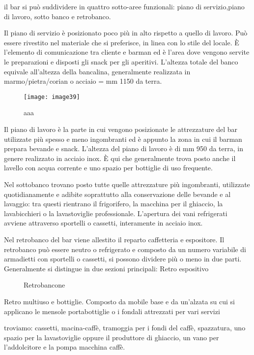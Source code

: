 il bar si può suddividere in quattro sotto-aree funzionali: piano di servizio,piano di lavoro, sotto banco  e retrobanco.

Il piano di servizio è posizionato poco più in alto rispetto a quello di lavoro. Può essere rivestito nel materiale che si preferisce, in linea con lo stile del locale. 
È l’elemento di comunicazione tra cliente e barman ed è l’area dove vengono servite le preparazioni e disposti gli snack per gli aperitivi.
L’altezza totale del banco equivale all'altezza della bancalina, generalmente realizzata in marmo/pietra/corian o acciaio  = mm 1150 da terra. 

\begin{figure}[H]
	\centering
	\texttt{[image: image39]}
	\caption{aaa}
	\label{fig:mesh1}
\end{figure}

Il piano di lavoro è la parte in cui vengono posizionate le attrezzature del bar utilizzate più spesso e meno ingombranti ed è appunto la zona in cui il barman prepara bevande e snack. L’altezza del piano di lavoro è di  mm 950 da terra, in genere realizzato in acciaio inox. 
È qui che generalmente trova posto anche il lavello con acqua corrente e uno spazio per bottiglie di uso frequente.

Nel sottobanco trovano posto tutte quelle attrezzature più ingombranti, utilizzate quotidianamente e adibite soprattutto alla conservazione delle bevande e al lavaggio: tra questi rientrano il frigorifero, la macchina per il ghiaccio, la lavabicchieri o la lavastoviglie professionale. L’apertura dei vani refrigerati avviene attraverso sportelli o cassetti, interamente  in acciaio inox.

Nel retrobanco del bar viene allestito il reparto caffetteria e espositore.
Il retrobanco può essere neutro o refrigerato e composto da un numero variabile di armadietti con sportelli o cassetti, si possono dividere più o meno in due parti.
Generalmente si distingue in due sezioni principali:
Retro espositivo


\begin{figure}[H]
	\captionsetup[subfloat]{farskip=2pt,captionskip=8pt}
	\centering
	\hspace{1cm}
	
	\caption{Retrobancone}
	\label{fig:imagesizes}
\end{figure}


Retro multiuso e bottiglie. Composto da mobile base e da un'alzata su cui si applicano le mensole portabottiglie o i fondali attrezzati per vari servizi 



troviamo: cassetti, macina-caffè,  tramoggia per i fondi del caffè, spazzatura, uno spazio per la lavastoviglie oppure il produttore di ghiaccio, un vano per l’addolcitore e la pompa macchina caffè.

